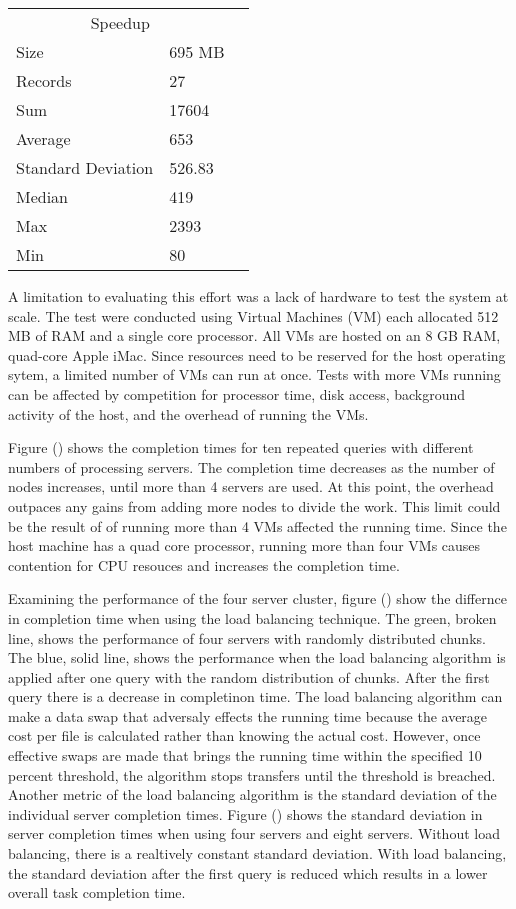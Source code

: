 \documentclass{article}
\begin{document}
\begin{multicols}{2}
\begin{tabular}{llr}
\hline
\multicolumn{2}{c}{Speedup} \\
\cline{1-2}
Size & 695 MB \\
Records & 27 \\
Sum & 17604 \\
Average & 653 \\ 
Standard Deviation & 526.83 \\
Median & 419 \\
Max & 2393 \\
Min & 80 \\
\hline
\end{tabular}




A limitation to evaluating this effort was a lack of hardware to test the system at scale. The test were conducted using Virtual Machines (VM) each allocated 512 MB of RAM and a single core processor.  All VMs are hosted on an 8 GB RAM, quad-core Apple iMac. Since resources need to be reserved for the host operating sytem, a limited number of VMs can run at once.  Tests with more VMs running can be affected by competition for processor time, disk access, background activity of the host, and the overhead of running the VMs.

Figure () shows the completion times for ten repeated queries with different numbers of processing servers.  The completion time decreases as the number of nodes increases, until more than 4 servers are used.  At this point, the overhead outpaces any gains from adding more nodes to divide the work.  This limit could be the result of of running more than 4 VMs affected the running time.  Since the host machine has a quad core processor, running more than four VMs causes contention for CPU resouces and increases the completion time.

Examining the performance of the four server cluster, figure () show the differnce in completion time when using the load balancing technique.  The green, broken line, shows the performance of four servers with randomly distributed chunks. The blue, solid line, shows the performance when the load balancing algorithm is applied after one query with the random distribution of chunks.  After the first query there is a decrease in completinon time.  The load balancing algorithm can make a data swap that adversaly effects the running time because the average cost per file is calculated rather than knowing the actual cost. However, once effective swaps are made that brings the running time within the specified 10 percent threshold, the algorithm stops transfers until the threshold is breached.  Another metric of the load balancing algorithm is the standard deviation of the individual server completion times. Figure () shows the standard deviation in server completion times when using four servers and eight servers.  Without load balancing, there is a realtively constant standard deviation.  With load balancing, the standard deviation after the first query is reduced which results in a lower overall task completion time.  



\end{multicols}
\end{document}
